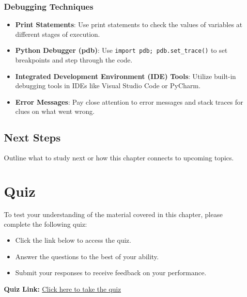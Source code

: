 \subsubsection{Debugging Techniques}
\begin{itemize}
    \item \textbf{Print Statements}: Use print statements to check the values of variables at different stages of execution.
    \item \textbf{Python Debugger (pdb)}: Use \texttt{import pdb; pdb.set\_trace()} to set breakpoints and step through the code.
    \item \textbf{Integrated Development Environment (IDE) Tools}: Utilize built-in debugging tools in IDEs like Visual Studio Code or PyCharm.
    \item \textbf{Error Messages}: Pay close attention to error messages and stack traces for clues on what went wrong.
\end{itemize}

\subsection*{Next Steps}
Outline what to study next or how this chapter connects to upcoming topics.


\section{Quiz}

To test your understanding of the material covered in this chapter, please complete the following quiz:

\begin{itemize}
    \item Click the link below to access the quiz.
    \item Answer the questions to the best of your ability.
    \item Submit your responses to receive feedback on your performance.
\end{itemize}

\noindent
\textbf{Quiz Link:} \href{https://forms.gle/3YLHGFkqjP5x8Zbz7}{Click here to take the quiz}
